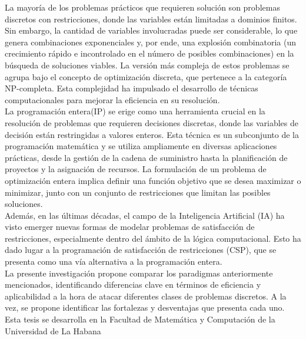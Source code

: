 \documentclass[runningheads]{llncs}
\begin{document}
La mayoría de los problemas prácticos que requieren solución son problemas discretos con restricciones, donde las variables están limitadas a dominios finitos. Sin embargo, la cantidad de variables involucradas puede ser considerable, lo que genera combinaciones exponenciales y, por ende, una explosión combinatoria (un crecimiento rápido e incontrolado en el número de posibles combinaciones) en la búsqueda de soluciones viables. La versión más compleja de estos problemas se agrupa bajo el concepto de optimización discreta, que pertenece a la categoría NP-completa. Esta complejidad ha impulsado el desarrollo de técnicas computacionales para mejorar la eficiencia en su resolución.  \\

La programación entera(IP) se erige como una herramienta crucial en la resolución de problemas que requieren decisiones discretas, donde las variables de decisión están restringidas a valores enteros. Esta técnica es un subconjunto de la programación matemática y se utiliza ampliamente en diversas aplicaciones prácticas, desde la gestión de la cadena de suministro hasta la planificación de proyectos y la asignación de recursos. La formulación de un problema de optimización entera implica definir una función objetivo que se desea maximizar o minimizar, junto con un conjunto de restricciones que limitan las posibles soluciones.  \\

Además, en las últimas décadas, el campo de la Inteligencia Artificial (IA) ha visto emerger nuevas formas de modelar problemas de satisfacción de restricciones, especialmente dentro del ámbito de la lógica computacional. Esto ha dado lugar a la programación de satisfacción de restricciones (CSP), que se presenta como una vía alternativa a la programación entera.  \\

La presente investigación propone comparar los paradigmas anteriormente mencionados, identificando diferencias clave en términos de eficiencia y aplicabilidad a la hora de atacar diferentes clases de problemas discretos. A la vez, se propone identificar las fortalezas y desventajas que presenta cada uno.  \\

Esta tesis se desarrolla en la Facultad de Matemática y Computación de la Universidad de La Habana  \\

\end{document}
